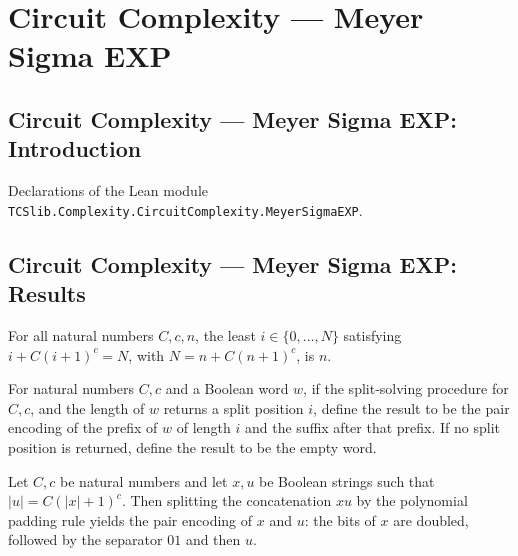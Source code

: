 \section{Circuit Complexity --- Meyer Sigma EXP}
\subsection*{Circuit Complexity --- Meyer Sigma EXP: Introduction}

Declarations of the Lean module \texttt{TCSlib.Complexity.CircuitComplexity.MeyerSigmaEXP}.

\subsection*{Circuit Complexity --- Meyer Sigma EXP: Results}

\begin{theorem}
\label{Complexity.Meyer.solveSplit_self'}
\leanok
{}
For all natural numbers $C,c,n$, the least $i\in\{0,\ldots,N\}$ satisfying
$i+C(i+1)^c=N$, with $N=n+C(n+1)^c$, is $n$.
\end{theorem}

\begin{definition}
\label{Complexity.Meyer.splitXU}
\leanok
{}
For natural numbers $C,c$ and a Boolean word $w$, if the split-solving procedure for
$C,c$, and the length of $w$ returns a split position $i$, define the result to be the
pair encoding of the prefix of $w$ of length $i$ and the suffix after that prefix. If no
split position is returned, define the result to be the empty word.
\end{definition}

\begin{theorem}
\label{Complexity.Meyer.splitXU_append}
\leanok
{}
Let $C,c$ be natural numbers and let $x,u$ be Boolean strings such that
$|u|=C(|x|+1)^c$. Then splitting the concatenation $xu$ by the polynomial
padding rule yields the pair encoding of $x$ and $u$: the bits of $x$ are doubled,
followed by the separator $01$ and then $u$.
\end{theorem}

